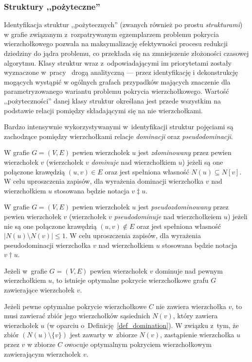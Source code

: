 \subsubsection{\textbf{Struktury ,,pożyteczne''}}
\label{sss_ckx_structures}
\par{
  Identyfikacja struktur ,,pożytecznych'' (zwanych również po prostu \emph{strukturami}) w grafie związanym z~rozpatrywanym egzemplarzem problemu pokrycia wierzchołkowego pozwala na maksymalizację efektywności procesu redukcji dziedziny do jądra problemu, co przekłada się na zmniejszenie złożoności czasowej algorytmu. Klasy struktur wraz z~odpowiadającymi im priorytetami zostały wyznaczone w~pracy~\cite{ImprovedBounds10} drogą analityczną --- przez identyfikację i dekonstrukcję mogących wystąpić w ogólnych grafach przypadków mających znaczenie dla parametryzowanego wariantu problemu pokrycia wierzchołkowego.
  Wartość ,,pożyteczności'' danej klasy struktur określana jest przede wszystkim na podstawie relacji pomiędzy składającymi się na nie wierzchołkami.
}
\par{
  Bardzo intensywnie wykorzystywanymi w~identyfikacji struktur pojęciami są zachodzące pomiędzy wierzchołkami relacje \emph{dominacji} oraz \emph{pseudodominacji}.
  \begin{definition}
    W grafie $G=(V, E)$ pewien wierzchołek $u$ jest \emph{zdominowany} przez pewien wierzchołek $v$ (wierzchołek $v$ \emph{dominuje} nad wierzchołkiem $u$) jeżeli są one połączone krawędzią $(u, v) \in E$ oraz jest spełniona własność $N(u) \subseteq N[v]$.
    W celu uproszczenia zapisów, dla wyrażenia dominacji wierzchołka $v$ nad wierzchołkiem $u$ stosowana będzie notacja $v \ddagger u$.
  \end{definition}
  \begin{definition}
    W grafie $G=(V, E)$ pewien wierzchołek $u$ jest \emph{pseudozdominowany} przez pewien wierzchołek $v$ (wierzchołek $v$ \emph{pseudodominuje} nad wierzchołkeiem $u$) jeżeli nie są one połączone krawędzią $(u, v) \notin E$ oraz jest spełniona własność $|N(u) \setminus N(v)| \leq 1$.
    W celu uproszczenia zapisów, dla wyrażenia pseudodominacji wierzchołka $v$ nad wierzchołkiem $u$ stosowana będzie notacja $v \dagger u$.
  \end{definition}
  \begin{theorem}
      Jeżeli w~grafie $G=(V, E)$ pewien wierzchołek $v$ dominuje nad pewnym wierzchołkiem $u$, to istnieje optymalne pokrycie wierzchołkowe grafu $G$ zawierające wierzchołek $v$.
  \end{theorem}
  \begin{bproof}
    Jeżeli pewne optymalne pokrycie wierzchołkowe $C$ nie zawiera wierzchołka $v$, to musi zawierać zbiór jego wierzchołków sąsiednich $N(v)$, który zawiera wierzchołek $u$ (w oparciu o~Definicję~\ref{def_domination}).
    W związku z~tym, że zbiór $(N(u) \setminus \{v\})$ jest zawarty w~zbiorze $N(v)$, zastąpienie wierzchołka $u$ przez $v$ w zbiorze $C$ owocuje optymalnym pokryciem wierzchołkowym zawierającym wierzchołek $v$.
  \end{bproof}
}
